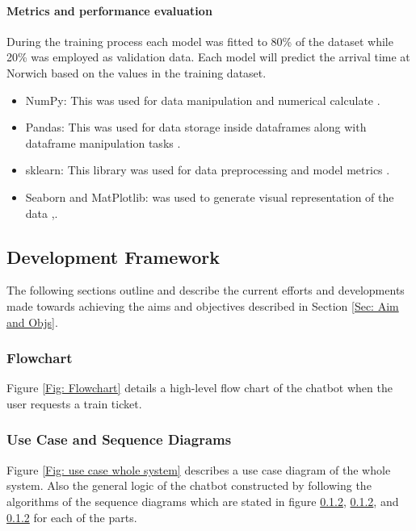 \paragraph{Metrics and performance evaluation}\label{Sec: Regression Metrics & performance}
During the training process each model was fitted to 80\% of the dataset while 20\% was employed as validation data. Each model will predict the arrival time at Norwich based on the values in the training dataset.

    \begin{itemize}
        \item NumPy: This was used for data manipulation and numerical calculate \citep{harris2020array}.
        \item Pandas: This was used for data storage inside dataframes along with dataframe manipulation tasks \citep{reback2020pandas}.
        \item sklearn: This library was used for data preprocessing and model metrics \citep{scikit-learn}.
        \item Seaborn and MatPlotlib: was used to generate visual representation of the data \citep{Waskom2021},\citep{Hunter:2007}.
    \end{itemize} 
 
\subsection{Development Framework}
The following sections outline and describe the current efforts and developments made towards achieving the aims and objectives described in Section \ref{Sec: Aim and Objs}.

\subsubsection{Flowchart}
Figure \ref{Fig: Flowchart} details a high-level flow chart of the chatbot when the user requests a train ticket. 

\subsubsection{Use Case and Sequence Diagrams}
Figure \ref{Fig: use case whole system} describes a use case diagram of the whole system. Also the general logic of the chatbot constructed by following the algorithms of the sequence diagrams which are stated in figure \ref{}, \ref{}, and \ref{} for each of the parts.

